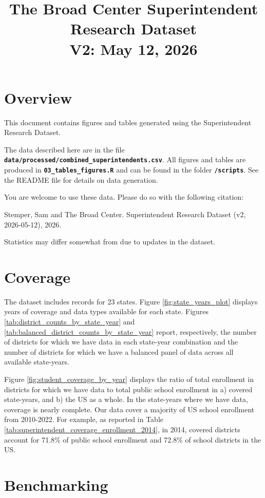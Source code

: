 \documentclass[12pt]{article}
\title{The Broad Center Superintendent Research Dataset \\  V2: May 12, 2026}
\date{}
\begin{document}
\maketitle
\section{Overview}
This document contains figures and tables generated using the Superintendent Research Dataset. 

The data described here are in the file \textbf{\texttt{data/processed/combined\_superintendents.csv}}. All figures and tables are produced in \textbf{\texttt{03\_tables\_figures.R}} and can be found in the folder \textbf{\texttt{/scripts}}. See the README file for details on data generation. 

You are welcome to use these data. Please do so with the following citation: 

\noindent Stemper, Sam and The Broad Center. Superintendent Research Dataset (v2, 2026-05-12), 2026. 

Statistics may differ somewhat from \citet{stemper} due to updates in the dataset. 

\section{Coverage}
The dataset includes records for 23 states. Figure \ref{fig:state_years_plot} displays years of coverage and data types available for each state. Figures \ref{tab:district_counts_by_state_year} and \ref{tab:balanced_district_counts_by_state_year} report, respectively, the number of districts for which we have data in each state-year combination and the number of districts for which we have a balanced panel of data across all available state-years. 

Figure \ref{fig:student_coverage_by_year} displays the ratio of total enrollment in districts for which we have data to total public school enrollment in a) covered state-years, and b) the US as a whole. In the state-years where we have data, coverage is nearly complete. Our data cover a majority of US school enrollment from 2010-2022. For example, as reported in Table \ref{tab:superintendent_coverage_enrollment_2014}, in 2014, covered districts account for 71.8\% of public school enrollment and 72.8\% of school districts in the US. 

\section{Benchmarking}
\end{document}
